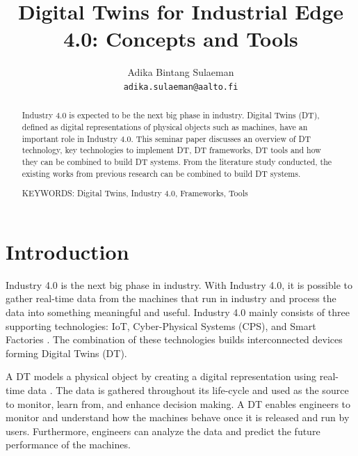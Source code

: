 \documentclass[article,table]{aaltoseries}
\begin{document}
 

\title{Digital Twins for Industrial Edge 4.0: Concepts and Tools}

\author{Adika Bintang Sulaeman%
\\\textnormal{\texttt{adika.sulaeman@aalto.fi}}} %


\maketitle


\begin{abstract}
  Industry 4.0 is expected to be the next big phase in industry. Digital Twins (DT), defined as digital representations of physical objects such as machines, have an important role in Industry 4.0. This seminar paper discusses an overview of DT technology, key technologies to implement DT, DT frameworks, DT tools and how they can be combined to build DT systems. From the literature study conducted, the existing works from previous research can be combined to build DT systems.
  
\vspace{3mm}
\noindent KEYWORDS: Digital Twins, Industry 4.0, Frameworks, Tools

\end{abstract}




\section{Introduction}

Industry 4.0 is the next big phase in industry. With Industry 4.0, it is possible to gather real-time data from the machines that run in industry and process the data into something meaningful and useful. Industry 4.0 mainly consists of three supporting technologies: IoT, Cyber-Physical Systems (CPS), and Smart Factories \cite{hermann2016design}. The combination of these technologies builds interconnected devices forming Digital Twins (DT).

A DT models a physical object by creating a digital representation using real-time data \cite{Cheatshe3:online}. The data is gathered throughout its life-cycle and used as the source to monitor, learn from, and enhance decision making. A DT enables engineers to monitor and understand how the machines behave once it is released and run by users. Furthermore, engineers can analyze the data and predict the future performance of the machines.
\end{document}
